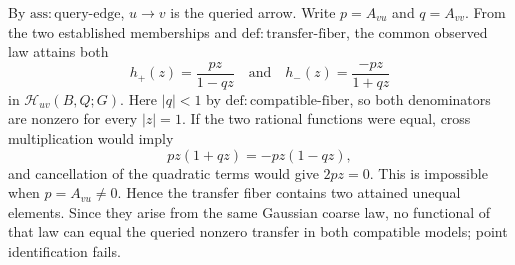 By \(\mathrm{ass{:}query\mbox{-}edge}\), \(u\to v\) is the queried arrow.  Write \(p=A_{vu}\) and \(q=A_{vv}\).  From the two established memberships and \(\mathrm{def{:}transfer\mbox{-}fiber}\), the common observed law attains both
\[
 h_+(z)=\frac{pz}{1-qz}
 \quad\text{and}\quad
 h_-(z)=\frac{-pz}{1+qz}
\]
in \(\mathcal H_{uv}(B,Q;G)\).  Here \(|q|<1\) by \(\mathrm{def{:}compatible\mbox{-}fiber}\), so both denominators are nonzero for every \(|z|=1\).  If the two rational functions were equal, cross multiplication would imply
\[
 pz(1+qz)=-pz(1-qz),
\]
and cancellation of the quadratic terms would give \(2pz=0\).  This is impossible when \(p=A_{vu}\ne0\).  Hence the transfer fiber contains two attained unequal elements.  Since they arise from the same Gaussian coarse law, no functional of that law can equal the queried nonzero transfer in both compatible models; point identification fails.

